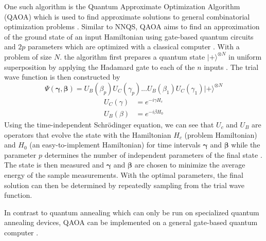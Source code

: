 One such algorithm is the Quantum Approximate Optimization Algorithm (QAOA) which is used to find approximate solutions to general combinatorial optimization problems \cite{b23}. Similar to NNQS, QAOA aims to find an approximation of the ground state of an input Hamiltonian using gate-based quantum circuits and $2p$ parameters which are optimized with a classical computer \cite{b34}. With a problem of size $N$. the algorithm first prepares a quantum state $| + \rangle^{\otimes N}$ in uniform superposition by applying the Hadamard gate to each of the $n$ inputs \cite{b34}. The trial wave function is then constructed by
\begin{equation}
    \Psi(\boldsymbol{\gamma}, \boldsymbol{\beta}) = U_B(\beta_p) U_C(\gamma_p)...U_B(\beta_1) U_C(\gamma_1) | + \rangle^{\otimes N}
\end{equation}
\begin{align*}
    U_C(\gamma) &= e^{-i\gamma H_c} \\
    U_B(\beta) &= e^{-i\beta H_0}
\end{align*}
Using the time-independent Schrödinger equation, we can see that $U_c$ and $U_B$ are operators that evolve the state with the Hamiltonian $H_c$ (problem Hamiltonian) and $H_0$ (an easy-to-implement Hamiltonian) for time intervals $\boldsymbol{\gamma}$ and $\boldsymbol{\beta}$ while the parameter $p$ determines the number of independent parameters of the final state \cite{b34}. The state is then measured and $\boldsymbol{\gamma}$ and $\boldsymbol{\beta}$ are chosen to minimize the average energy of the sample measurements. With the optimal parameters, the final solution can then be determined by repeatedly sampling from the trial wave function.

In contrast to quantum annealing which can only be run on specialized quantum annealing devices, QAOA can be implemented on a general gate-based quantum computer \cite{b22}. 